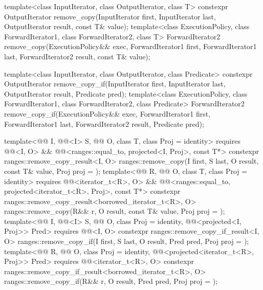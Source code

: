 %
%
\begin{itemdecl}
template<class InputIterator, class OutputIterator, class T>
  constexpr OutputIterator
    remove_copy(InputIterator first, InputIterator last,
                OutputIterator result, const T& value);
template<class ExecutionPolicy, class ForwardIterator1, class ForwardIterator2,
         class T>
  ForwardIterator2
    remove_copy(ExecutionPolicy&& exec,
                ForwardIterator1 first, ForwardIterator1 last,
                ForwardIterator2 result, const T& value);

template<class InputIterator, class OutputIterator, class Predicate>
  constexpr OutputIterator
    remove_copy_if(InputIterator first, InputIterator last,
                   OutputIterator result, Predicate pred);
template<class ExecutionPolicy, class ForwardIterator1, class ForwardIterator2,
         class Predicate>
  ForwardIterator2
    remove_copy_if(ExecutionPolicy&& exec,
                   ForwardIterator1 first, ForwardIterator1 last,
                   ForwardIterator2 result, Predicate pred);

template<@@ I, @@<I> S, @@ O, class T,
         class Proj = identity>
  requires @@<I, O> &&
           @@<ranges::equal_to, projected<I, Proj>, const T*>
  constexpr ranges::remove_copy_result<I, O>
    ranges::remove_copy(I first, S last, O result, const T& value, Proj proj = {});
template<@@ R, @@ O, class T, class Proj = identity>
  requires @@<iterator_t<R>, O> &&
           @@<ranges::equal_to, projected<iterator_t<R>, Proj>, const T*>
  constexpr ranges::remove_copy_result<borrowed_iterator_t<R>, O>
    ranges::remove_copy(R&& r, O result, const T& value, Proj proj = {});
template<@@ I, @@<I> S, @@ O,
         class Proj = identity, @@<projected<I, Proj>> Pred>
  requires @@<I, O>
  constexpr ranges::remove_copy_if_result<I, O>
    ranges::remove_copy_if(I first, S last, O result, Pred pred, Proj proj = {});
template<@@ R, @@ O, class Proj = identity,
         @@<projected<iterator_t<R>, Proj>> Pred>
  requires @@<iterator_t<R>, O>
  constexpr ranges::remove_copy_if_result<borrowed_iterator_t<R>, O>
    ranges::remove_copy_if(R&& r, O result, Pred pred, Proj proj = {});
\end{itemdecl}

